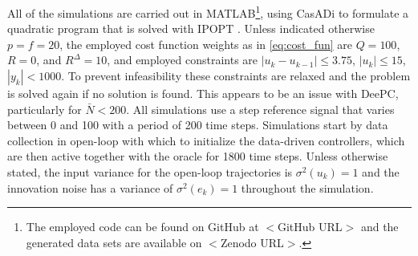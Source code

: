 All of the simulations are carried out in MATLAB\footnote{The employed code can be found on GitHub at $<$GitHub URL$>$ and the generated data sets are available on $<$Zenodo URL$>$.}, using CasADi \citep{Andersson2019} to formulate a quadratic program that is solved with IPOPT \citep{Wachter2006}. Unless indicated otherwise $p=f=20$, the employed cost function weights as in \eqref{eq:cost_fun} are $Q=100$, $R=0$, and $R^\Delta=10$, and employed constraints are $|u_k-u_{k-1}|\leq3.75$, $|u_k|\leq15$, $|y_k|<1000$. To prevent infeasibility these constraints are relaxed and the problem is solved again if no solution is found. This appears to be an issue with \ac{DeePC}, particularly for $\bar{N}<200$. All simulations use a step reference signal that varies between 0 and 100 with a period of 200 time steps. Simulations start by data collection in open-loop with which to initialize the data-driven controllers, which are then active together with the oracle for 1800 time steps. Unless otherwise stated, the input variance for the open-loop trajectories is $\sigma^2(u_k)=1$ and the innovation noise has a variance of $\sigma^2(e_k)=1$ throughout the simulation.